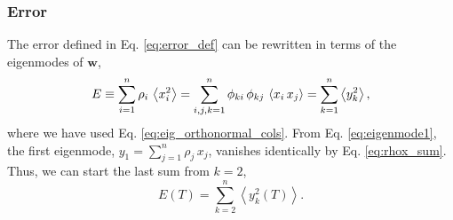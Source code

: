 \documentclass[reprint, superscriptaddress, floatfix]{revtex4-1}
\newcommand{\Err}{E}
\begin{document}
\subsubsection{Error}



The error defined in Eq. \eqref{eq:error_def}
can be rewritten in terms of the eigenmodes of $\mathbf w$,
%
\begin{align}
  \Err
  \equiv
  \sum_{i = 1}^n \rho_i \,
    \left\langle x_i^2 \right\rangle
  =
  \sum_{i, j, k=1}^n \phi_{ki} \, \phi_{kj} \,
    \left\langle x_i \, x_j \right\rangle
  =
  \sum_{k = 1}^n
    \left\langle
      y_k^2
    \right\rangle
  ,
\notag
\end{align}
%
where we have used Eq. \eqref{eq:eig_orthonormal_cols}.
%
From Eq. \eqref{eq:eigenmode1},
the first eigenmode,
$y_1 = \sum_{j=1}^n \rho_j \, x_j$,
vanishes identically by Eq. \eqref{eq:rhox_sum}.
%
Thus, we can start the last sum %
from $k = 2$,
%
\begin{equation}
  \Err(T)
  =
  \sum_{k = 2}^n
    \left\langle
    y_k^2(T)
    \right\rangle
  .
\label{eq:y2_sum}
\end{equation}
\end{document}
